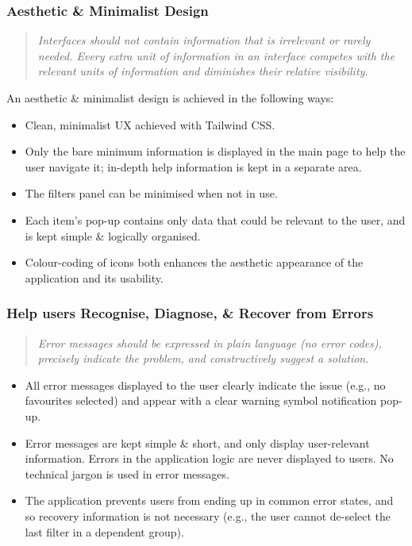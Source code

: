 \documentclass[a4paper,11pt]{report}
\begin{document}
\subsubsection{Aesthetic \& Minimalist Design}
\begin{quote}
    \textit{ Interfaces should not contain information that is irrelevant or rarely needed. Every extra unit of information in an interface competes with the relevant units of information and diminishes their relative visibility. }
\end{quote}

An aesthetic \& minimalist design is achieved in the following ways:
\begin{itemize}
    \item   Clean, minimalist UX achieved with Tailwind CSS.
    \item   Only the bare minimum information is displayed in the main page to help the user navigate it;
            in-depth help information is kept in a separate area.
    \item   The filters panel can be minimised when not in use.
    \item   Each item's pop-up contains only data that could be relevant to the user, and is kept simple \& logically organised.
    \item   Colour-coding of icons both enhances the aesthetic appearance of the application and its usability.
\end{itemize}

\subsubsection{Help users Recognise, Diagnose, \& Recover from Errors}
\begin{quote}
    \textit{ Error messages should be expressed in plain language (no error codes), precisely indicate the problem, and constructively suggest a solution. }
\end{quote}

\begin{itemize}
    \item   All error messages displayed to the user clearly indicate the issue (e.g., no favourites selected) and appear with a clear warning symbol notification pop-up.
    \item   Error messages are kept simple \& short, and only display user-relevant information.
            Errors in the application logic are never displayed to users.
            No technical jargon is used in error messages.
    \item   The application prevents users from ending up in common error states, and so recovery information is not necessary (e.g., the user cannot de-select the last filter in a dependent group).
\end{itemize}
\end{document}

